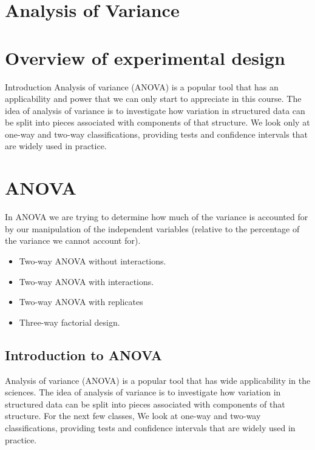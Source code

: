 \documentclass[a4paper,12pt]{article}
\begin{document}
\section{Analysis of Variance}


\section{Overview of experimental design}

Introduction
Analysis of variance (ANOVA) is a popular tool that has an applicability and
power that we can only start to appreciate in this course. The idea of analysis of
variance is to investigate how variation in structured data can be split into pieces associated
with components of that structure. We look only at one-way and two-way
classifications, providing tests and confidence intervals that are widely used in practice.

\section{ANOVA}
In ANOVA we are trying to determine how much of the variance is
accounted for by our manipulation of the independent variables (relative to the percentage of the variance we cannot account for).
\begin{itemize}
\item Two-way ANOVA without interactions. \item Two-way ANOVA with
interactions.\item Two-way ANOVA with replicates \item Three-way
factorial design.
\end{itemize}

\subsection{Introduction to ANOVA}
Analysis of variance (ANOVA) is a popular tool that has wide applicability in the sciences. The idea of analysis of
variance is to investigate how variation in structured data can be split into pieces associated
with components of that structure. For the next few classes, We look at one-way and two-way
classifications, providing tests and confidence intervals that are widely used in practice.
\end{document}

